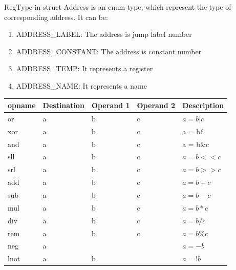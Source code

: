 \documentclass{article}
\begin{document}
RegType in struct Address is an enum type, which represent the type of corresponding address. It can be:
\begin{enumerate}
\item
ADDRESS\_LABEL: The address is jump label number
\item
ADDRESS\_CONSTANT: The address is constant number
\item
ADDRESS\_TEMP: It represents a register
\item
ADDRESS\_NAME: It represents a name
\end{enumerate}

\begin{table}[!h]
    \begin{tabular}{|l|l|l|l|l|}
    \hline
    opname & Destination &  			Operand 1        &  			Operand 2 & Description                  \\ \hline
    or     & a           & b                    & c             & $a = b|c    $                  \\ \hline
    xor    & a           & b                    & c             & a = b\^c                     \\ \hline
    and    & a           & b                    & c             & a = b\&c                    \\ \hline
    sll    & a           & b                    & c             & $a = b<<c    $                 \\ \hline
    srl    & a           & b                    & c             & $a = b>>c     $                \\ \hline
    add    & a           & b                    & c             & $a = b+c     $                 \\ \hline
    sub    & a           & b                    & c             & $a = b-c$                      \\ \hline
    mul    & a           & b                    & c             & $a = b*c  $                    \\ \hline
    div    & a           & b                    & c             & $a = b/c $                     \\ \hline
    rem    & a           & b                    & c             &$ a = b\%c  $                   \\ \hline
    neg    & a           & ~                    & ~             &$ a = -b   $                    \\ \hline
    lnot   & a           & b                    & ~             & $a = !b   $                    \\ \hline

\end{tabular}
\end{table}
\end{document}
